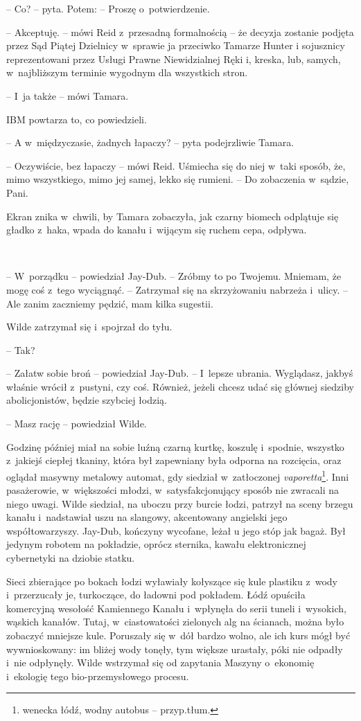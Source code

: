\documentclass[oneside,polish,11pt,sfheadings]{mwbk}
\begin{document}
-- Co? -- pyta. Potem: -- Proszę o~potwierdzenie.

-- Akceptuję. -- mówi Reid z~przesadną formalnością -- że decyzja zostanie
podjęta przez Sąd Piątej Dzielnicy w~sprawie ja przeciwko Tamarze Hunter
i sojusznicy reprezentowani przez Usługi Prawne Niewidzialnej Ręki i,
kreska, lub, samych, w~najbliższym terminie wygodnym dla wszystkich
stron.

-- I~ja także -- mówi Tamara.

IBM powtarza to, co powiedzieli.

-- A w~międzyczasie, żadnych łapaczy? -- pyta podejrzliwie Tamara.

-- Oczywiście, bez łapaczy -- mówi Reid. Uśmiecha się do niej w~taki
sposób, że, mimo wszystkiego, mimo jej samej, lekko się rumieni. -- Do
zobaczenia w~sądzie, Pani.

Ekran znika w~chwili, by Tamara zobaczyła, jak czarny biomech odplątuje
się gładko z~haka, wpada do kanału i~wijącym się ruchem cepa, odpływa.

~

-- W~porządku -- powiedział Jay-Dub. -- Zróbmy to po Twojemu. Mniemam, że
mogę coś z~tego wyciągnąć. -- Zatrzymał się na skrzyżowaniu nabrzeża i~ulicy. -- Ale zanim zaczniemy pędzić, mam kilka sugestii.

Wilde zatrzymał się i~spojrzał do tyłu. 

-- Tak?

-- Załatw sobie broń -- powiedział Jay-Dub. -- I~lepsze ubrania. Wyglądasz,
jakbyś właśnie wrócił z~pustyni, czy coś. Również, jeżeli chcesz udać
się głównej siedziby abolicjonistów, będzie szybciej łodzią.

-- Masz rację -- powiedział Wilde.

Godzinę później miał na sobie luźną czarną kurtkę, koszulę i~spodnie,
wszystko z~jakiejś ciepłej tkaniny, która był zapewniany była odporna na
rozcięcia, oraz oglądał masywny metalowy automat, gdy siedział w~zatłoczonej \emph{vaporetta}\footnote{wenecka łódź, wodny autobus -- przyp.tłum.}. Inni pasażerowie, w~większości młodzi, w~satysfakcjonujący sposób nie zwracali na niego uwagi. Wilde siedział, na
uboczu przy burcie łodzi, patrzył na sceny brzegu kanału i~nadstawiał
uszu na slangowy, akcentowany angielski jego współtowarzyszy. Jay-Dub,
kończyny wycofane, leżał u jego stóp jak bagaż. Był jedynym robotem na
pokładzie, oprócz sternika, kawału elektronicznej cybernetyki na dziobie
statku.

Sieci zbierające po bokach łodzi wyławiały kołyszące się kule plastiku z~wody i~przerzucały je, turkoczące, do ładowni pod pokładem. Łódź
opuściła komercyjną wesołość Kamiennego Kanału i~wpłynęła do serii
tuneli i~wysokich, wąskich kanałów. Tutaj, w~ciastowatości zielonych alg
na ścianach, można było zobaczyć mniejsze kule. Poruszały się w~dół
bardzo wolno, ale ich kurs mógł być wywnioskowany: im bliżej wody
tonęły, tym większe urastały, póki nie odpadły i~nie odpłynęły. Wilde
wstrzymał się od zapytania Maszyny o~ekonomię i~ekologię tego
bio-przemysłowego procesu.
\end{document}
